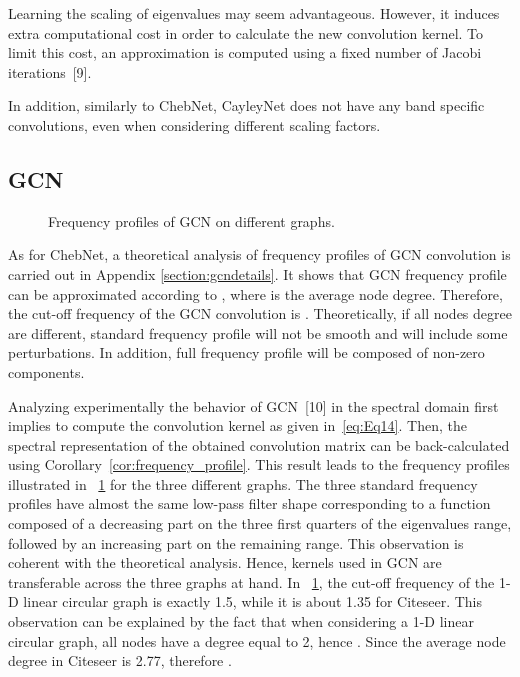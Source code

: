 \documentclass{article}
\begin{document}
Learning the scaling of eigenvalues may seem advantageous. However, it induces extra computational cost in order to calculate the new convolution kernel. To limit this cost, an approximation is computed using a fixed number of Jacobi iterations~[9].
 
In addition, similarly to ChebNet, CayleyNet does not have any band specific convolutions, even when considering different scaling factors. 

\subsection*{GCN } 
\label{subsecGCN}


\begin{figure}[t]
  \centering
  \caption{Frequency profiles of GCN on different graphs.}
  \label{fig:gcnnfreq}
  \medskip
\end{figure}

As for ChebNet, a theoretical analysis of frequency profiles of GCN convolution is carried out in Appendix \ref{section:gcndetails}. It shows that GCN frequency profile can be approximated according to , where  is the average node degree. Therefore, the cut-off frequency of the GCN convolution is . Theoretically, if all  nodes degree are different, standard frequency profile will not be smooth and will include some perturbations. In addition, full frequency profile will be composed of non-zero components.  

Analyzing experimentally the behavior of GCN~[10] in the spectral domain first implies to compute the convolution kernel as given in~\eqref{eq:Eq14}. Then, the spectral representation of the obtained convolution matrix can be back-calculated using Corollary~\ref{cor:frequency_profile}. This result leads to the frequency profiles illustrated in \figurename~\ref{fig:gcnnfreq} for the three different graphs. The three standard frequency profiles have almost the same low-pass filter shape corresponding to a function composed of a decreasing part on the three first quarters of the eigenvalues range, followed by an increasing part on the remaining range. This observation is coherent with the theoretical analysis. Hence, kernels used in GCN are transferable across the three graphs at hand. In \figurename~\ref{fig:gcnnfreq}, the cut-off frequency of the 1-D linear circular graph is exactly 1.5, while it is about 1.35 for Citeseer. This observation can be explained by the fact that when considering a 1-D linear circular graph, all nodes have a degree equal to 2, hence  . Since the average node degree in Citeseer is 2.77, therefore .
\end{document}
